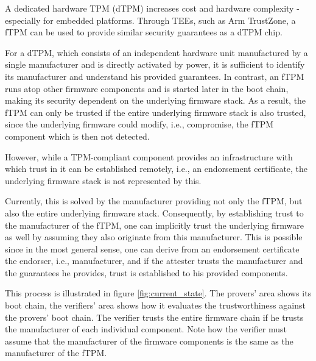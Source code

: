 A dedicated hardware TPM (dTPM) increases cost and hardware complexity - especially for embedded platforms.
Through \acp{TEE}, such as Arm TrustZone, a \ac{fTPM} can be used to provide similar security guarantees as a dTPM chip.


For a dTPM, which consists of an independent hardware unit manufactured by a single manufacturer and is directly activated by power, it is sufficient to identify its manufacturer and understand his provided guarantees.
In contrast, an \ac{fTPM} runs atop other firmware components and is started later in the boot chain, making its security dependent on the underlying firmware stack.
As a result, the fTPM can only be trusted if the entire underlying firmware stack is also trusted, since the underlying firmware could modify, i.e., compromise, the fTPM component which is then not detected.


However, while a TPM-compliant component provides an infrastructure with which trust in it can be established remotely, i.e., an endorsement certificate, the underlying firmware stack is not represented by this.


Currently, this is solved by the manufacturer providing not only the fTPM, but also the entire underlying firmware stack.
Consequently, by establishing trust to the manufacturer of the fTPM, one can implicitly trust the underlying firmware as well by assuming they also originate from this manufacturer.
This is possible since in the most general sense, one can derive from an endorsement certificate the endorser, i.e., manufacturer, and if the attester trusts the manufacturer and the guarantees he provides, trust is established to his provided components.



This process is illustrated in figure \autoref{fig:current_state}. The provers' area shows its boot chain, the verifiers' area shows how it evaluates the trustworthiness against the provers' boot chain. The verifier trusts the entire firmware chain if he trusts the manufacturer of each individual component. Note how the verifier must assume that the manufacturer of the firmware components is the same as the manufacturer of the fTPM.



